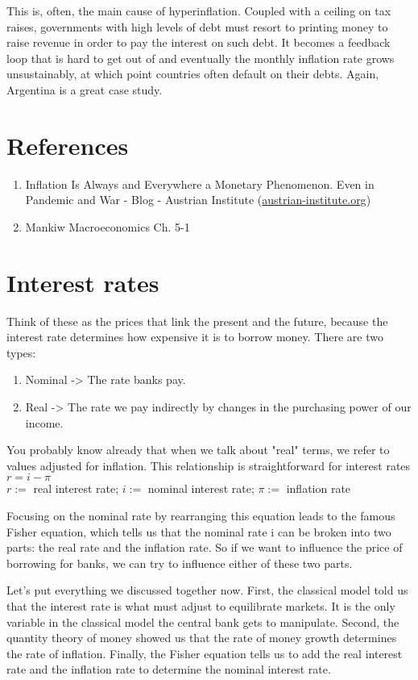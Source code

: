 \documentclass[10pt]{article}
\begin{document}
This is, often, the main cause of hyperinflation. Coupled with a ceiling on tax raises, governments with high levels of debt must resort to printing money to raise revenue in order to pay the interest on such debt. It becomes a feedback loop that is hard to get out of and eventually the monthly inflation rate grows unsustainably, at which point countries often default on their debts. Again, Argentina is a great case study.

\section*{References}
\begin{enumerate}
  \item Inflation Is Always and Everywhere a Monetary Phenomenon. Even in Pandemic and War - Blog - Austrian Institute (\href{http://austrian-institute.org}{austrian-institute.org})
  \item Mankiw Macroeconomics Ch. 5-1
\end{enumerate}

\section*{Interest rates}
Think of these as the prices that link the present and the future, because the interest rate determines how expensive it is to borrow money. There are two types:

\begin{enumerate}
  \item Nominal -> The rate banks pay.
  \item Real -> The rate we pay indirectly by changes in the purchasing power of our income.
\end{enumerate}

You probably know already that when we talk about "real" terms, we refer to values adjusted for inflation. This relationship is straightforward for interest rates\\
$r=i-\pi$\\
$r:=$ real interest rate; $i:=$ nominal interest rate; $\pi:=$ inflation rate

Focusing on the nominal rate by rearranging this equation leads to the famous Fisher equation, which tells us that the nominal rate i can be broken into two parts: the real rate and the inflation rate. So if we want to influence the price of borrowing for banks, we can try to influence either of these two parts.

Let's put everything we discussed together now. First, the classical model told us that the interest rate is what must adjust to equilibrate markets. It is the only variable in the classical model the central bank gets to manipulate. Second, the quantity theory of money showed us that the rate of money growth determines the rate of inflation. Finally, the Fisher equation tells us to add the real interest rate and the inflation rate to determine the nominal interest rate.
\end{document}
